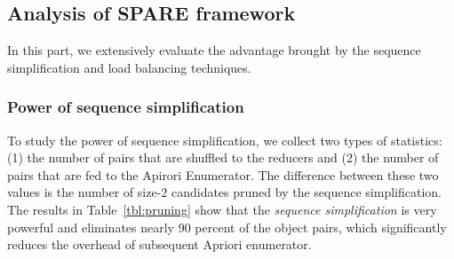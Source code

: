 


\subsection{Analysis of SPARE framework}
In this part, we extensively evaluate the advantage brought by the
sequence simplification and load balancing techniques.

\subsubsection{Power of sequence simplification}
To study the power of sequence simplification,
we collect two types of statistics: (1) the number of pairs that
are shuffled to the reducers and (2) the number of pairs that
are fed to the Apirori Enumerator. The difference between these two values is the number of size-$2$ candidates pruned by the sequence simplification.
The results in Table~\ref{tbl:pruning} show that the \emph{sequence simplification} is very powerful and eliminates nearly 90 percent of the object pairs, which significantly reduces the overhead of subsequent Apriori enumerator.

